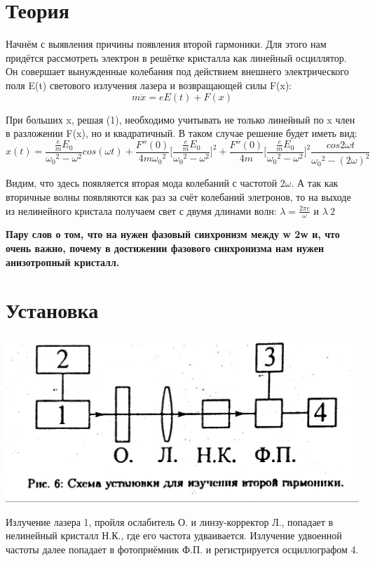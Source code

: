 \documentclass[a4paper,14pt]{article} %
\begin{document}


\newpage

\section{Теория}
Начнём с выявления причины появления второй гармоники. Для этого нам придётся рассмотреть электрон в решётке кристалла как линейный осциллятор. Он совершает вынужденные колебания под действием внешнего электрического поля E(t) светового излучения лазера и возвращающей силы F(x):\\
\begin{equation}
m \ddot{x} = e E(t) + F(x)
\end{equation}

При больших x, решая (1), необходимо учитывать не только линейный по x член в разложении F(x), но и квадратичный. В таком случае решение будет иметь вид:
\begin{equation}
x(t) = \frac{\frac{e}{m} E_0}{{\omega_0}^2 - {\omega}^2} cos(\omega t) 
+ \frac{F''(0)}{4m {\omega_0}^2} \Big[\frac{\frac{e}{m} E_0}{{\omega_0}^2 - {\omega}^2}\Big]^2
+ \frac{F''(0)}{4m} \Big[\frac{\frac{e}{m} E_0}{{\omega_0}^2 - {\omega}^2}\Big]^2
\frac{cos2\omega t}{{\omega_0}^2 - (2 \omega)^2}
\end{equation}

Видим, что здесь появляется вторая мода колебаний с частотой $2 \omega$. А так как вторичные волны появляются как раз за счёт колебаний элетронов, то на выходе из нелинейного кристала получаем свет с двумя длинами волн: $\lambda = \frac{2 \pi c}{\omega}$ и $\lambda \ 2$

\textbf{Пару слов о том, что на нужен фазовый синхронизм между w  2w и, что очень важно, почему в достижении фазового синхронизма нам нужен анизотропный кристалл.}

\section{Установка}
\begin{center}
\includegraphics[width = 0.5 \textwidth]{images/setup.jpg}
\end{center}
Излучение лазера 1, пройля ослабитель О. и линзу-корректор Л., попадает в нелинейный кристалл Н.К., где его частота удваивается. Излучение удвоенной частоты далее попадает в фотоприёмник Ф.П. и регистрируется осциллографом 4.
\end{document}
